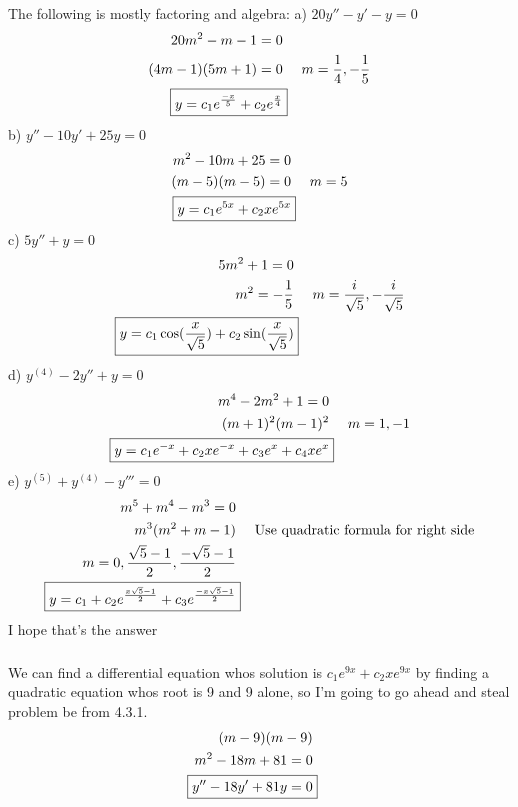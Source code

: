 \documentclass{article}
\begin{document}
\subsection{}
\subsubsection{}
The following is mostly factoring and algebra:
\newline a) $20y'' - y' - y = 0$
\begin{align*}
    20m^2 - m - 1 = 0 \\
    (4m-1)(5m+1) = 0 && m = \frac{1}{4}, -\frac{1}{5} \\
    \Aboxed{y = c_1e^{\frac{-x}{5}} + c_2e^{\frac{x}{4}}}
\end{align*}
b) $ y'' - 10y' + 25y = 0$
\begin{align*}
    m^2 - 10m + 25 = 0 \\
    (m-5)(m-5) = 0 && m = 5 \\
    \Aboxed{y = c_1e^{5x} + c_2xe^{5x}}
\end{align*}
c) $ 5y'' + y = 0$
\begin{align*}
    5m^2 + 1 = 0 \\
    m^2 = -\frac{1}{5} && m = \frac{i}{\sqrt{5}}, -\frac{i}{\sqrt{5}} \\
    \Aboxed{y = c_1\cos(\frac{x}{\sqrt{5}}) + c_2\sin(\frac{x}{\sqrt{5}})}
\end{align*}
d) $ y^{(4)} - 2y'' + y = 0$
\begin{align*}
    m^4 -2m^2 + 1 = 0\\
    (m+1)^2(m-1)^2 && m = 1,-1 \\
    \Aboxed{y = c_1e^{-x} + c_2xe^{-x} + c_3e^x + c_4xe^x}
\end{align*}
e) $ y^{(5)} + y^{(4)} - y''' = 0$
\begin{align*}
    m^5 + m^4 - m^3 = 0\\
    m^3(m^2+m-1) && \text{Use quadratic formula for right side} \\ 
    m = 0,\frac{\sqrt{5}-1}{2},\frac{-\sqrt{5}-1}{2} \\
    \Aboxed{y = c_1+c_2e^{\frac{x\sqrt{5}-1}{2}} + c_3e^{\frac{-x\sqrt{5}-1}{2}}}
\end{align*}
I hope that's the answer
\subsubsection{}
We can find a differential equation whos solution is $c_1e^{9x} + c_2xe^{9x}$ by finding a quadratic equation whos root is 9 and 9 alone, so I'm going to go ahead and steal problem be from 4.3.1.
\begin{align*}
    (m-9)(m-9) \\
    m^2 - 18m + 81 = 0 \\
    \Aboxed{ y'' - 18y' +81y = 0}
\end{align*}
\end{document}
